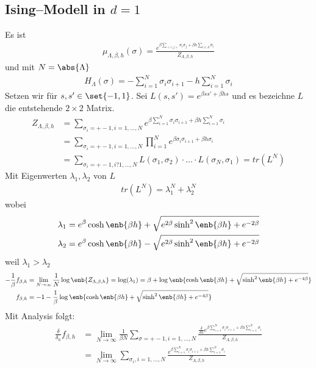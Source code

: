  \subsection{Ising--Modell in $d=1$}
 Es ist 
 \begin{align}
 	\mu_{\Lambda, \beta, h}(\sigma) = \frac{e^{\beta \sum_{<i,j>}\sigma_i\sigma_j + \beta h \sum_{i \in \Lambda} \sigma_i  } }{Z_{\Lambda, \beta, h}}
 \end{align}
 und mit $N = \abs{\Lambda}$
 \begin{align}
 	H_{\Lambda}(\sigma) = - \sum\limits_{i = 1}^{N} \sigma_i \sigma_{i+1} - h \sum\limits_{i=1}^{N} \sigma_i
 \end{align}
 Setzen wir für $s,s' \in \set{-1,1}$. Sei $L(s,s') = e^{\beta ss' + \beta h s}$ und es bezeichne $L$ die entstehende $2 \times 2$ Matrix.
 \begin{align}
 	Z_{\Lambda, \beta, h} &= \sum\limits_{\sigma_i = +-1, i = 1,\dots,N} e^{\beta \sum\limits_{i=1}^{N} \sigma_i \sigma_{i+1} + \beta h \sum\limits_{i = 1}^{N} \sigma_i } \\
		 	&= \sum\limits_{\sigma_i = +-1, i = 1,\dots,N} \prod\limits_{i=1}^{N} e^{\beta \sigma_i \sigma_{i+1} + \beta h \sigma_i }  \\
		 	&= \sum\limits_{\sigma_i = +-1, i ? 1,\dots,N } L(\sigma_1,\sigma_2) \cdot \dots  \cdot L(\sigma_N,\sigma_1) = tr(L^N)
 \end{align}
 Mit Eigenwerten $\lambda_1, \lambda_2$ von $L$ 
 \begin{align}
 	tr(L^N) = \lambda_1^N+\lambda_2^N
 \end{align}
 wobei
 \begin{align}
 	\lambda_1 &= e^{\beta} \cosh\enb{\beta h} + \sqrt{e^{2\beta} \sinh^2\enb{\beta h} + e^{-2\beta} } \\
 	\lambda_2 &= e^{\beta} \cosh\enb{\beta h} - \sqrt{e^{2\beta} \sinh^2\enb{\beta h} + e^{-2\beta} }
 \end{align}
 weil $\lambda_1 > \lambda_2$ 
 \begin{align}
 	-\frac{1}{\beta} f_{\beta,h} &= \lim\limits_{N \to \infty} \frac{1}{N} \log \enb{Z_{\Lambda,\beta,h}} = \log(\lambda_1) = \beta + \log \enb{\cosh\enb{\beta h} + \sqrt{\sinh^2\enb{\beta h} + e^{-4\beta } } } \\
 	f_{\beta,h} &= -1 - \frac{1}{\beta} \log \enb{\cosh\enb{\beta h} + \sqrt{\sinh^2\enb{\beta h} + e^{-4\beta } } }
 \end{align}
 Mit Analysis folgt:
 \begin{align}
 	\frac{\delta}{\delta_h}f_{\beta, h } &= \lim\limits_{N \to \infty} \frac{1}{\beta N} \sum\limits_{\sigma = +-1, i = 1, \dots, N} \frac{\frac{\delta}{\delta h} e^{\beta \sum_{i = 1}^{N} \sigma_i \sigma_{i+1} + \beta h \sum_{i =1}^{N} \sigma_i  }}{Z_{\Lambda, \beta, h}} \\
 		&= \lim\limits_{N \to \infty} \sum\limits_{\sigma_i, i = 1,\dots,N} \frac{e^{\beta \sum_{i = 1}^{N} \sigma_i \sigma_{i+1} + \beta h \sum_{i = 1}^{N} \sigma_i }}{Z_{\Lambda,\beta,h}}
 \end{align}

